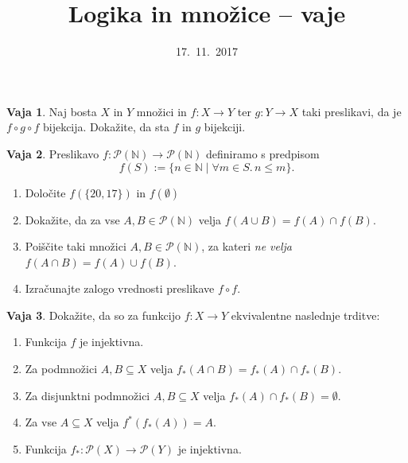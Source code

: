 \documentclass{article}
\newcommand{\NN}{\mathbb{N}}
\theoremstyle{definition}
\newtheorem{vaja}{Vaja}
\begin{document}
\title{Logika in množice -- vaje}
\date{17.~11.~2017}
\maketitle

\begin{vaja}
  Naj bosta $X$ in $Y$  množici in $f\colon X \to Y$ ter $g\colon Y \to X$ taki preslikavi, da je $f \circ g \circ f$ bijekcija. Dokažite, da sta $f$ in $g$ bijekciji.
\end{vaja}

\begin{vaja}
	Preslikavo $f\colon \mathcal{P}(\NN) \to \mathcal{P}(\NN)$ definiramo s predpisom
	\[f(S) := \{n \in \mathbb{N} \mid \forall m \in S.\, n \leq m\}.\]
	\begin{enumerate}
		\item Določite $f(\{20,17\})$ in $f(\emptyset)$
		\item Dokažite, da za vse $A, B \in \mathcal{P}(\mathbb{N})$ velja $f(A \cup B) = f(A) \cap f(B)$.
		\item Poiščite taki množici $A, B \in \mathcal{P}(\mathbb{N})$, za kateri \emph{ne velja} $f(A \cap B) = f(A) \cup f(B)$.
		\item Izračunajte zalogo vrednosti preslikave $f \circ f$.
	\end{enumerate}
\end{vaja}

\begin{vaja}
  Dokažite, da so za funkcijo $f\colon X \to Y$ ekvivalentne naslednje trditve:
  \begin{enumerate}
    \item Funkcija $f$ je injektivna.
    \item Za podmnožici $A, B \subseteq X$ velja $f_*(A \cap B) = f_*(A) \cap f_*(B)$.
    \item Za disjunktni podmnožici $A, B \subseteq X$ velja $f_*(A) \cap f_*(B) = \emptyset$.
    \item Za vse $A \subseteq X$ velja $f^{*}(f_*(A)) = A$.
    \item Funkcija $f_* \colon \mathcal{P}(X) \to \mathcal{P}(Y)$ je injektivna.
  \end{enumerate}
\end{vaja}
\end{document}
